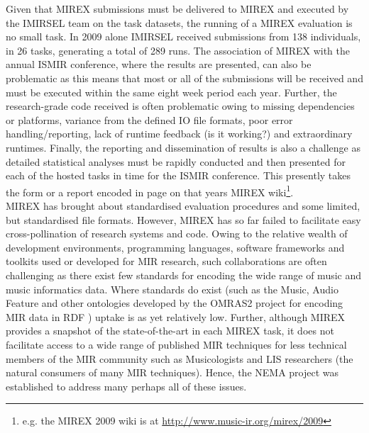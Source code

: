 \documentclass[conference]{IEEEtran}
\begin{document}
Given that MIREX submissions must be delivered to MIREX and executed by the IMIRSEL team on the task datasets, the running of a MIREX evaluation is no small task. In 2009 alone IMIRSEL received submissions from 138 individuals, in 26 tasks, generating a total of 289 runs. 
The association of MIREX with the annual ISMIR conference, where the results are presented, can also be problematic as this means that most or all of the submissions will be received and must be executed within the same eight week period each year. 
Further, the research-grade code received is often problematic owing to missing dependencies or platforms, variance from the defined IO file formats, poor error handling/reporting, lack of runtime feedback (is it working?) and extraordinary runtimes. 
Finally, the reporting and dissemination of results is also a challenge as detailed statistical analyses must be rapidly conducted and then presented for each of the hosted tasks in time for the ISMIR conference. This presently takes the form or a report encoded in page on that years MIREX wiki\footnote{e.g. the MIREX 2009 wiki is at \url{http://www.music-ir.org/mirex/2009}}.\\

MIREX has brought about standardised evaluation procedures and some limited, but standardised file formats.
However, MIREX has so far failed to facilitate easy cross-pollination of research systems and code. Owing to the relative wealth of development environments, programming languages, software frameworks and toolkits used or developed for MIR research, such collaborations are often challenging as there exist few standards for encoding the wide range of music and music informatics data. Where standards do exist (such as the Music, Audio Feature and other ontologies developed by the OMRAS2 project for encoding MIR data in RDF \cite{raimond2007music}) uptake is as yet relatively low.  
Further, although MIREX provides a snapshot of the state-of-the-art in each MIREX task, it does not facilitate access to a wide range of published MIR techniques for less technical members of the MIR community such as Musicologists and LIS researchers (the natural consumers of many MIR techniques). Hence, the NEMA project was established to address many perhaps all of these issues.
\end{document}
